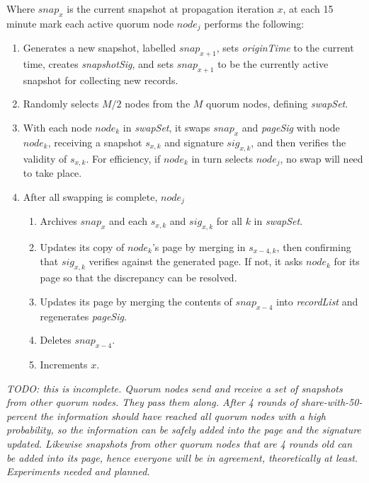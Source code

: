 
Where $ snap_{x} $ is the current snapshot at propagation iteration $ x $, at each 15 minute mark each active quorum node $ node_{j} $ performs the following:

\begin{enumerate}
	\item Generates a new snapshot, labelled $ snap_{x+1} $, sets \emph{originTime} to the current time, creates \emph{snapshotSig}, and sets $ snap_{x+1} $ to be the currently active snapshot for collecting new records.
	\item Randomly selects $ M / 2 $ nodes from the $ M $ quorum nodes, defining \emph{swapSet}.
	\item With each node $ node_{k} $ in \emph{swapSet}, it swaps $ snap_{x} $ and \emph{pageSig} with node $ node_{k} $, receiving a snapshot $ s_{x, k} $ and signature $ sig_{x, k} $, and then verifies the validity of $ s_{x, k} $. For efficiency, if $ node_{k} $ in turn selects $ node_{j} $, no swap will need to take place.
	\item After all swapping is complete, $ node_{j} $
		\begin{enumerate}
			\item Archives $ snap_{x} $ and each $ s_{x, k} $ and $ sig_{x, k} $ for all $ k $ in \emph{swapSet}.
			\item Updates its copy of $ node_{k} $'s page by merging in $ s_{x-4, k} $, then confirming that $ sig_{x, k} $ verifies against the generated page. If not, it asks $ node_{k} $ for its page so that the discrepancy can be resolved.
			\item Updates its page by merging the contents of $ snap_{x-4} $ into \emph{recordList} and regenerates \emph{pageSig}.
			\item Deletes $ snap_{x-4} $.
			\item Increments $ x $.
		\end{enumerate}
\end{enumerate}


\emph{TODO: this is incomplete. Quorum nodes send and receive a set of snapshots from other quorum nodes. They pass them along. After 4 rounds of share-with-50-percent the information should have reached all quorum nodes with a high probability, so the information can be safely added into the page and the signature updated. Likewise snapshots from other quorum nodes that are 4 rounds old can be added into its page, hence everyone will be in agreement, theoretically at least. Experiments needed and planned.}


